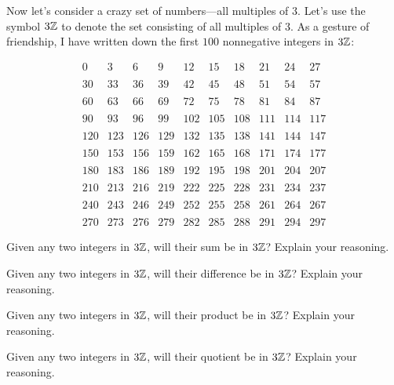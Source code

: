 \documentclass[nooutcomes]{ximera}
\begin{document}
Now let's consider a crazy set of numbers---all multiples of
$3$. Let's use the symbol $3\mathbb Z$ to denote the set consisting of all
multiples of $3$. As a gesture of friendship, I have written down the
first $100$ nonnegative integers in $3\mathbb Z$:


\[
\begin{array}{cccccccccc}
0   & 3   & 6   & 9   & 12  & 15  & 18  & 21  & 24  & 27  \\
\\
30  & 33  & 36  & 39  & 42  & 45  & 48  & 51  & 54  & 57  \\
\\
60  & 63  & 66  & 69  & 72  & 75  & 78  & 81  & 84  & 87  \\
\\
90  & 93  & 96  & 99  & 102 & 105 & 108 & 111 & 114 & 117 \\
\\
120 & 123 & 126 & 129 & 132 & 135 & 138 & 141 & 144 & 147 \\
\\
150 & 153 & 156 & 159 & 162 & 165 & 168 & 171 & 174 & 177 \\
\\
180 & 183 & 186 & 189 & 192 & 195 & 198 & 201 & 204 & 207 \\
\\
210 & 213 & 216 & 219 & 222 & 225 & 228 & 231 & 234 & 237 \\
\\
240 & 243 & 246 & 249 & 252 & 255 & 258 & 261 & 264 & 267 \\
\\
270 & 273 & 276 & 279 & 282 & 285 & 288 & 291 & 294 & 297
\end{array}
\]



\begin{question}
Given any two integers in $3\mathbb Z$, will their sum be in $3\mathbb Z$? Explain
your reasoning.
\end{question}

\begin{question}
Given any two integers in $3\mathbb Z$, will their difference be in $3\mathbb Z$?
Explain your reasoning.
\end{question}

\begin{question}
Given any two integers in $3\mathbb Z$, will their product be in $3\mathbb Z$?
Explain your reasoning.
\end{question}

\begin{question}
Given any two integers in $3\mathbb Z$, will their quotient be in $3\mathbb Z$?
Explain your reasoning.
\end{question}
\end{document}
